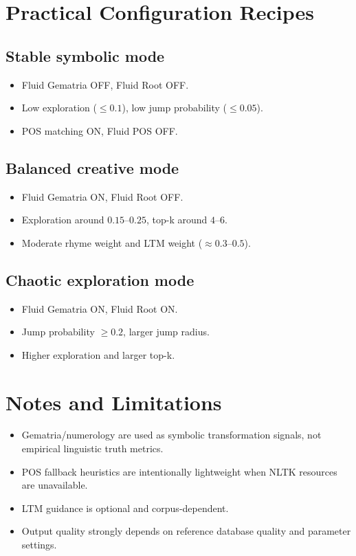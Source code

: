 \documentclass[11pt,a4paper]{report}
\begin{document}
\chapter{Practical Configuration Recipes}
\section{Stable symbolic mode}
\begin{itemize}
  \item Fluid Gematria OFF, Fluid Root OFF.
  \item Low exploration ($\le 0.1$), low jump probability ($\le 0.05$).
  \item POS matching ON, Fluid POS OFF.
\end{itemize}

\section{Balanced creative mode}
\begin{itemize}
  \item Fluid Gematria ON, Fluid Root OFF.
  \item Exploration around $0.15$--$0.25$, top-k around $4$--$6$.
  \item Moderate rhyme weight and LTM weight ($\approx 0.3$--$0.5$).
\end{itemize}

\section{Chaotic exploration mode}
\begin{itemize}
  \item Fluid Gematria ON, Fluid Root ON.
  \item Jump probability $\ge 0.2$, larger jump radius.
  \item Higher exploration and larger top-k.
\end{itemize}

\chapter{Notes and Limitations}
\begin{itemize}
  \item Gematria/numerology are used as symbolic transformation signals, not empirical linguistic truth metrics.
  \item POS fallback heuristics are intentionally lightweight when NLTK resources are unavailable.
  \item LTM guidance is optional and corpus-dependent.
  \item Output quality strongly depends on reference database quality and parameter settings.
\end{itemize}
\end{document}
